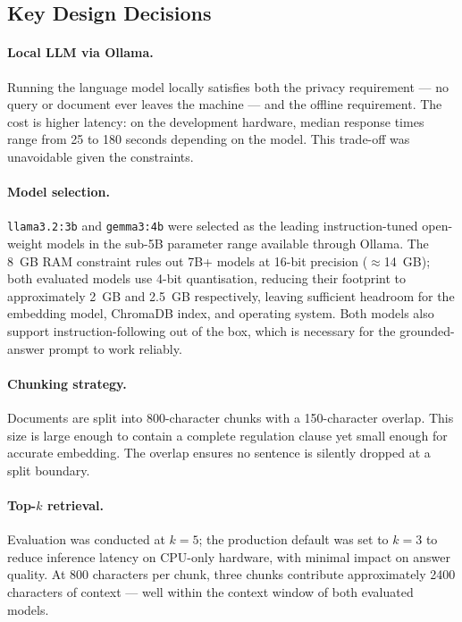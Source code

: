 \subsection{Key Design Decisions}
\label{sec:design-decisions}

\paragraph{Local LLM via Ollama.}
Running the language model locally satisfies both the privacy requirement ---
no query or document ever leaves the machine --- and the offline requirement.
The cost is higher latency: on the development hardware, median response times
range from 25 to 180 seconds depending on the model. This trade-off was
unavoidable given the constraints.

\paragraph{Model selection.}
\texttt{llama3.2:3b} and \texttt{gemma3:4b} were selected as the leading
instruction-tuned open-weight models in the sub-5B parameter range available
through Ollama. The 8~GB RAM constraint rules out 7B+ models at 16-bit
precision ($\approx$14~GB); both evaluated models use 4-bit quantisation,
reducing their footprint to approximately 2~GB and 2.5~GB respectively, leaving sufficient headroom for
the embedding model, ChromaDB index, and operating system. Both models also
support instruction-following out of the box, which is necessary for the
grounded-answer prompt to work reliably.

\paragraph{Chunking strategy.}
Documents are split into 800-character chunks with a 150-character overlap.
This size is large enough to contain a complete regulation clause yet small
enough for accurate embedding. The overlap ensures no sentence is silently
dropped at a split boundary.

\paragraph{Top-$k$ retrieval.}
Evaluation was conducted at $k = 5$; the production default was set to
$k = 3$ to reduce inference latency on CPU-only hardware, with minimal
impact on answer quality. At 800 characters per chunk, three chunks contribute approximately 2400
characters of context — well within the context window of both evaluated
models.

